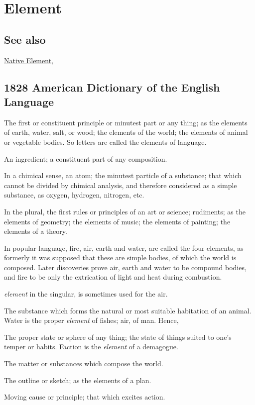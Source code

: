 \section{Element}
	\label{ELEMENT}
	
\subsection{See also}

	\hyperref[NATIVEELEMENT]{Native Element},

\subsection{1828 American Dictionary of the English Language} %
	\label{ELEMENT-1828}

	\begin{compactitem}
		\item[1] The first or constituent principle or minutest part or any thing; as the elements of earth, water, salt, or wood; the elements of the world; the elements of animal or vegetable bodies. So letters are called the elements of language.
		\item[2] An ingredient; a constituent part of any composition.
		\item[3] In a chimical sense, an atom; the minutest particle of a substance; that which cannot be divided by chimical analysis, and therefore considered as a simple substance, as oxygen, hydrogen, nitrogen, etc.
		\item[4] In the plural, the first rules or principles of an art or science; rudiments; as the elements of geometry; the elements of music; the elements of painting; the elements of a theory.
		\item[5] In popular language, fire, air, earth and water, are called the four elements, as formerly it was supposed that these are simple bodies, of which the world is composed. Later discoveries prove air, earth and water to be compound bodies, and fire to be only the extrication of light and heat during combustion.
		\item[6] \textit{element} in the singular, is sometimes used for the air.
		\item[7] The substance which forms the natural or most suitable habitation of an animal. Water is the proper \textit{element} of fishes; air, of man. Hence,
		\item[8] The proper state or sphere of any thing; the state of things suited to one's temper or habits. Faction is the \textit{element} of a demagogue.
		\item[9] The matter or substances which compose the world.
		\item[10] The outline or sketch; as the elements of a plan.
		\item[11] Moving cause or principle; that which excites action.
	\end{compactitem}

